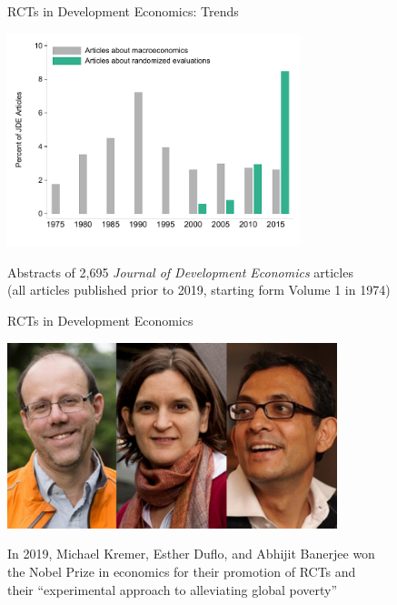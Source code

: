 \documentclass[10pt,xcolor=table,ignorenonframetext,handout,aspectratio=169]{beamer}
\begin{document}

\begin{frame}{RCTs in Development Economics:  Trends}

\medskip

\begin{center}
\includegraphics[width=0.64\textwidth]{fig/jde-hist1.pdf}
\end{center}

Abstracts of 2,695 \textit{Journal of Development Economics} articles \\
(all articles published prior to 2019, starting form Volume 1 in 1974)


\end{frame}



\newpage
\begin{frame}{RCTs in Development Economics}

\medskip

\begin{center}
	\includegraphics[width=0.72\textwidth]{photos/nobel.png}
\end{center}

\medskip
In 2019, Michael Kremer, Esther Duflo, and Abhijit Banerjee won \\
the Nobel Prize in economics for their promotion of RCTs and\\
their ``experimental approach to alleviating global poverty''


\end{frame}
\end{document}
